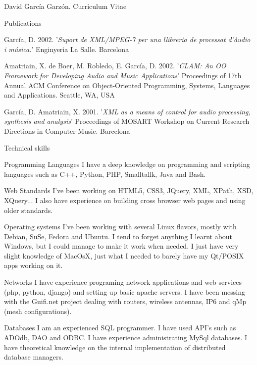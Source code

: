 \documentclass{article}
\begin{document}
\begin{cv}{David García Garzón. Curriculum Vitae}
\begin{cvlist}{Publications}
\item[] {\sc García, D.} 2002.
'{\em Suport de XML/MPEG-7 per una llibreria de processat d'àudio i música.}'
Enginyeria La Salle. Barcelona

\item[] {\sc Amatriain, X. de Boer, M. Robledo, E. García, D.} 2002.
'{\em CLAM: An OO Framework for Developing Audio and Music Applications}'
Proceedings of 17th Annual ACM Conference on Object-Oriented Programming, Systems, Languages and Applications. Seattle, WA, USA

\item[] {\sc García, D. Amatriain, X.} 2001.
'{\em XML as a means of control for audio processing, synthesis and analysis}'
Proceedings of MOSART Workshop on Current Research Directions in Computer Music. Barcelona
	
\end{cvlist}


\begin{cvlist}{Technical skills}

\item[Programming Languages]
	I have a deep knowledge on programming and scripting languages such  as C++, Python, PHP, Smalltallk, Java and Bash. 

\item[Web Standards]
	I've been working on HTML5, CSS3, JQuery, XML, XPath, XSD, XQuery... I also have experience on building cross browser web pages and using older standards.

\item[Operating systems]
	I've been working with several Linux flavors, mostly with Debian, SuSe, Fedora and Ubuntu. I tend to forget anything I learnt about Windows, but I could manage to make it work when needed. I just have very slight knowledge of MacOsX, just what I needed to barely have my Qt/POSIX apps working on it.

\item[Networks]
	I have experience programing network applications and web services (php, python, django) and setting up basic apache servers. I have been messing with the Guifi.net project dealing with routers, wireless antennas, IP6 and qMp (mesh configurations). 

\item[Databases]
	I am an experienced SQL programmer. I have used API's such as ADOdb, DAO and ODBC. I have experience administrating MySql databases. I have theoretical knowledge on the internal implementation of distributed database managers. 


\end{cvlist}
\end{cv}
\end{document}
